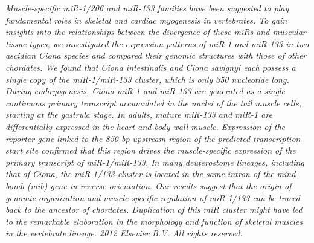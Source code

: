 \cite{Kusakabe2013}
\textit{Muscle-specific miR-1/206 and miR-133 families have been suggested to play fundamental roles in skeletal and cardiac myogenesis in vertebrates. To gain insights into the relationships between the divergence of these miRs and muscular tissue types, we investigated the expression patterns of miR-1 and miR-133 in two ascidian Ciona species and compared their genomic structures with those of other chordates. We found that Ciona intestinalis and Ciona savignyi each possess a single copy of the miR-1/miR-133 cluster, which is only 350 nucleotide long. During embryogenesis, Ciona miR-1 and miR-133 are generated as a single continuous primary transcript accumulated in the nuclei of the tail muscle cells, starting at the gastrula stage. In adults, mature miR-133 and miR-1 are differentially expressed in the heart and body wall muscle. Expression of the reporter gene linked to the 850-bp upstream region of the predicted transcription start site confirmed that this region drives the muscle-specific expression of the primary transcript of miR-1/miR-133. In many deuterostome lineages, including that of Ciona, the miR-1/133 cluster is located in the same intron of the mind bomb (mib) gene in reverse orientation. Our results suggest that the origin of genomic organization and muscle-specific regulation of miR-1/133 can be traced back to the ancestor of chordates. Duplication of this miR cluster might have led to the remarkable elaboration in the morphology and function of skeletal muscles in the vertebrate lineage. {\textcopyright} 2012 Elsevier B.V. All rights reserved.}

